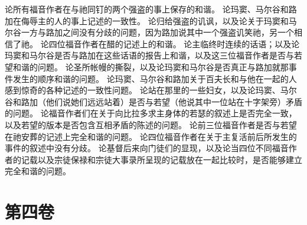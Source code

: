 论所有福音作者在与祂同钉的两个强盗的事上保存的和谐。\newline{} 论玛窦、马尔谷和路加在侮辱主的人的事上记述的一致性。\newline{} 论归给强盗的讥讽，以及论关于玛窦和马尔谷一方与路加之间没有分歧的问题，因为路加说其中一个强盗讥笑祂，另一个相信了祂。\newline{} 论四位福音作者在醋的记述上的和谐。\newline{} 论主临终时连续的话语；以及论玛窦和马尔谷是否与路加在这些话语的报告上和谐，以及这三位福音作者是否与若望和谐的问题。\newline{} 论圣所帐幔的撕裂，以及论玛窦和马尔谷是否真正与路加就那事件发生的顺序和谐的问题。\newline{} 论玛窦、马尔谷和路加关于百夫长和与他在一起的人感到惊奇的各种记述的一致性问题。\newline{} 论站在那里的一些妇女，以及论玛窦、马尔谷和路加（他们说她们远远站着）是否与若望（他说其中一位站在十字架旁）矛盾的问题。\newline{} 论福音作者们在关于向比拉多求主身体的若瑟的叙述上是否完全一致，以及若望的版本是否包含互相矛盾的陈述的问题。\newline{} 论前三位福音作者是否与若望在祂安葬的记述上完全和谐的问题。\newline{} 论四位福音作者在关于主复活前后所发生的事件的叙述中没有分歧。\newline{} 论基督后来向门徒们的显现，以及论当四位不同福音作者的记载以及宗徒保禄和宗徒大事录所呈现的记载放在一起比较时，是否能够建立完全和谐的问题。\par


\section{第四卷}

\par

